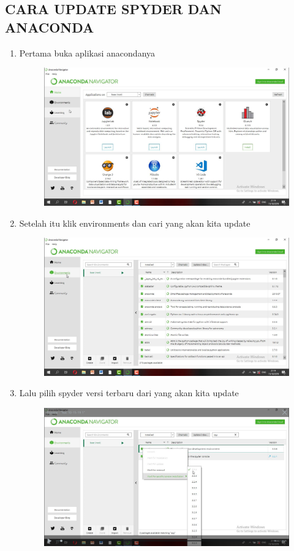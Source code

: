\begin{enumerate}
\begin{enumerate}
\section*{CARA UPDATE SPYDER DAN ANACONDA}
\begin{enumerate}
\item Pertama buka aplikasi anacondanya
\begin{figure}[h]
    \centering
    \includegraphics[scale=0.2]{gambar/17.png}
    \caption{}
    \label{fig:my_label}
\end{figure}
\item Setelah itu klik environments dan cari yang akan kita update
\begin{figure}[h]
    \centering
    \includegraphics[scale=0.2]{gambar/18.png}
    \caption{}
    \label{fig:my_label}
\end{figure}
\item Lalu pilih spyder versi terbaru dari yang akan kita update
\begin{figure}[h]
    \centering
    \includegraphics[scale=0.2]{gambar/19.png}

\end{figure}
\end{enumerate}
\end{enumerate}
\end{enumerate}
